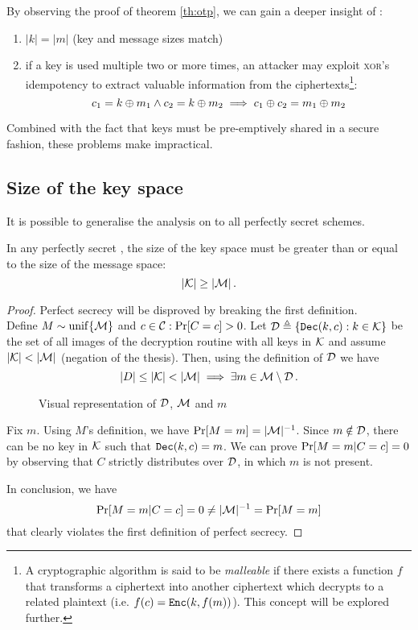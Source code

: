 
By observing the proof of theorem \ref{th:otp}, we can  gain a deeper insight of \otp:
%
\begin{enumerate}
    \item $|k| = |m|$ (key and message sizes match)
    \item if a key is used multiple two or more times, an attacker may exploit \textsc{xor}'s idempotency to extract valuable information from the ciphertexts\footnote{A cryptographic algorithm is said to be \emph{malleable} if there exists a function $f$ that transforms a ciphertext into another ciphertext which decrypts to a related plaintext (i.e. $f(c) = \texttt{Enc}(k, f(m))$). This concept will be explored further.}:
    \[
        c_1 = k \oplus m_1 \wedge c_2 = k \oplus m_2 \implies c_1 \oplus c_2 = m_1 \oplus m_2
    \]
\end{enumerate}
%
Combined with the fact that keys must be pre-emptively shared in a secure fashion, these problems make \otp{} impractical.


\subsection{Size of the key space}
It is possible to generalise the analysis on \otp{} to all perfectly secret schemes.

\begin{theorem}
    In any perfectly secret \ske, the size of the key space must be greater than or equal to the size of the message space:
    \[
    	|\mathcal{K}| \geq |\mathcal{M}| \, .
    \]
\end{theorem}
\begin{proof}
    Perfect secrecy will be disproved by breaking the first definition. \\
    Define $M \sim \operatorname{unif}\{\mathcal{M}\}$ and $c \in \mathcal{C} : \Pr[C = c] > 0$.
    Let $\mathcal{D} \triangleq \{\texttt{Dec}(k, c) : k \in \mathcal{K}\}$ be the set of all images of the decryption routine with all keys in $\mathcal{K}$ and assume $|\mathcal{K}| < |\mathcal{M}|$ (negation of the thesis).
    Then, using the definition of $\mathcal{D}$ we have
    \[
        |D| \leq |\mathcal{K}| < |\mathcal{M}| \implies \exists m \in \mathcal{M} \setminus \mathcal{D} \, .
    \]
    
    \begin{figure}[h]
    	\centering
    	
    	\caption{Visual representation of $\mathcal{D}$, $\mathcal{M}$ and $m$}
    \end{figure}

    Fix $m$. Using $M$'s definition, we have $\Pr[M = m] = |\mathcal{M}|^{-1}$.
    Since $m \notin \mathcal{D}$, there can be no key in $\mathcal{K}$ such that $\texttt{Dec}(k, c) = m$.
    We can prove $\Pr[M = m|C = c] = 0$ by observing that $C$ strictly distributes over $\mathcal{D}$, in which $m$ is not present.
    
    In conclusion, we have
    \[
        \Pr[M = m|C = c] = 0 \neq |\mathcal{M}|^{-1} = \Pr[M = m]
    \]
    that clearly violates the first definition of perfect secrecy.
\end{proof}

